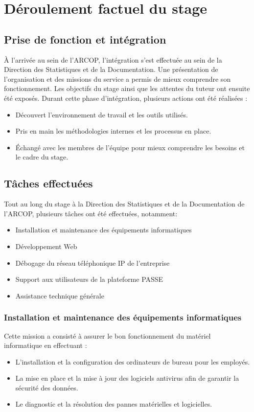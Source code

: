 \chapter{Déroulement factuel du stage}
\clearpage


\section{Prise de fonction et intégration}
À l'arrivée au sein de l'ARCOP, l'intégration s'est effectuée au sein de la Direction des Statistiques et de la Documentation. Une présentation de l'organisation et des missions du service a permis de mieux comprendre son fonctionnement. Les objectifs du stage ainsi que les attentes du tuteur ont ensuite été exposés.
Durant cette phase d'intégration, plusieurs actions ont été réalisées :

\begin{itemize}
    \item Découvert l'environnement de travail et les outils utilisés.
    \item Pris en main les méthodologies internes et les processus en place.
    \item Échangé avec les membres de l'équipe pour mieux comprendre les besoins et le cadre du stage.

\end{itemize}
\section{Tâches effectuées}
Tout au long du stage à la Direction des Statistiques et de la Documentation de l'ARCOP, plusieurs tâches ont été effectuées, notamment:
\begin{itemize}
    \item Installation et maintenance des équipements informatiques
    \item Développement Web
    \item Débogage du réseau téléphonique IP de l'entreprise 
    \item Support aux utilisateurs de la plateforme PASSE
    \item Assistance technique générale    
\end{itemize} 
\subsection{Installation et maintenance des équipements informatiques}
Cette mission a consisté à assurer le bon fonctionnement du matériel informatique en effectuant :
\begin{itemize}
    \item L’installation et la configuration des ordinateurs de bureau pour les employés.

    \item La mise en place et la mise à jour des logiciels antivirus afin de garantir la sécurité des données.
    \item Le diagnostic et la résolution des pannes matérielles et logicielles.
\end{itemize}
